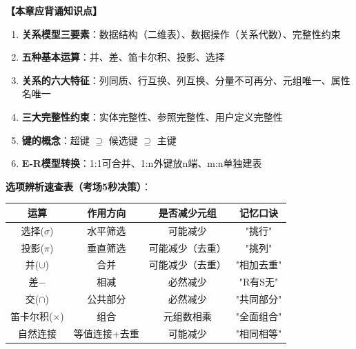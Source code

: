 \documentclass[12pt, a4paper]{article}
\newenvironment{bluebox}[1]{%
  \begin{trivlist}
  \item[\hskip\labelsep \textbf{#1}]
  \setlength{\parskip}{0.5ex}
  \setlength{\itemsep}{0.5ex}
}{%
  \end{trivlist}
}
\begin{document}
\begin{bluebox}{命题人思维版}
	\textbf{【本章应背诵知识点】}

	\begin{enumerate}[leftmargin=*, label=\textbf{\arabic*.}]
		\item \textbf{关系模型三要素}：数据结构（二维表）、数据操作（关系代数）、完整性约束
		\item \textbf{五种基本运算}：并、差、笛卡尔积、投影、选择
		\item \textbf{关系的六大特征}：列同质、行互换、列互换、分量不可再分、元组唯一、属性名唯一
		\item \textbf{三大完整性约束}：实体完整性、参照完整性、用户定义完整性
		\item \textbf{键的概念}：超键 $\supseteq$ 候选键 $\supseteq$ 主键
		\item \textbf{E-R模型转换}：1:1可合并、1:n外键放n端、m:n单独建表
	\end{enumerate}

	\textbf{选项辨析速查表（考场5秒决策）}：

	\begin{tabular}{|c|c|c|c|}
		\hline
		\textbf{运算}    & \textbf{作用方向} & \textbf{是否减少元组} & \textbf{记忆口诀} \\
		\hline
		选择($\sigma$)   & 水平筛选          & 可能减少            & "挑行"          \\
		\hline
		投影($\pi$)      & 垂直筛选          & 可能减少（去重）        & "挑列"          \\
		\hline
		并($\cup$)      & 合并            & 可能减少（去重）        & "相加去重"        \\
		\hline
		差$-$           & 相减            & 必然减少            & "R有S无"        \\
		\hline
		交($\cap$)      & 公共部分          & 必然减少            & "共同部分"        \\
		\hline
		笛卡尔积($\times$) & 组合            & 元组数相乘           & "全面组合"        \\
		\hline
		自然连接           & 等值连接+去重       & 可能减少            & "相同相等"        \\
		\hline
	\end{tabular}
\end{bluebox}
\end{document}
